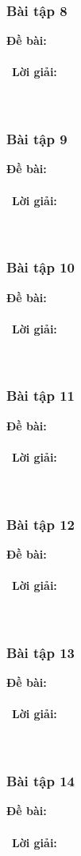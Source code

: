 \documentclass[a4paper]{article}
\begin{document}
\subsubsection{Bài tập 8}
\textbf{Đề bài:} 
\\\ \\\
\textbf{Lời giải:} \\\ \\\
\clearpage
\subsubsection{Bài tập 9}
\textbf{Đề bài:} 
\\\ \\\
\textbf{Lời giải:} \\\ \\\
\clearpage
\subsubsection{Bài tập 10}
\textbf{Đề bài:} 
\\\ \\\
\textbf{Lời giải:} \\\ \\\
\clearpage
\subsubsection{Bài tập 11}
\textbf{Đề bài:} 
\\\ \\\
\textbf{Lời giải:} \\\ \\\
\clearpage
\subsubsection{Bài tập 12}
\textbf{Đề bài:} 
\\\ \\\
\textbf{Lời giải:} \\\ \\\
\clearpage
\subsubsection{Bài tập 13}
\textbf{Đề bài:} 
\\\ \\\
\textbf{Lời giải:} \\\ \\\
\clearpage
\subsubsection{Bài tập 14}
\textbf{Đề bài:} 
\\\ \\\
\textbf{Lời giải:} \\\ \\\
\clearpage
\end{document}
